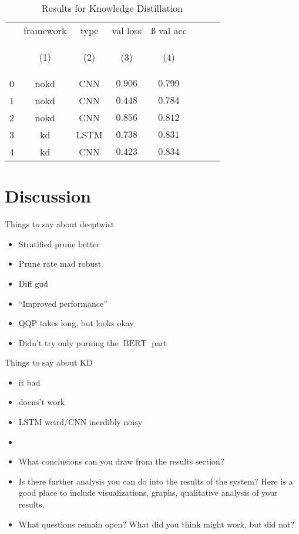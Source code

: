\documentclass[10pt]{article}
\newcommand{\bert}{\operatorname{BERT}}
\begin{document}
\begin{table}[tbh]
        \caption{Results for Knowledge Distillation}
        \label{tab:kd_results}
        \centering
        \vspace{1em}
        \begin{tabular}{lccccccc}
\toprule
{} &  framework &  type &  val loss &  ß val acc \\
{} & \hypertarget{tabcol:1}{(1)} & \hypertarget{tabcol:2}{(2)} & \hypertarget{tabcol:3}{(3)} & \hypertarget{tabcol:4}{(4)} \\
\midrule
0 &        nokd &   CNN &   $0.906$ &   $0.799$ \\
1 &        nokd &   CNN &   $0.448$ &   $0.784$ \\
2 &        nokd &   CNN &   $0.856$ &   $0.812$ \\
3 &          kd &  LSTM &   $0.738$ &   $0.831$ \\
4 &          kd &   CNN &   $0.423$ &   $0.834$ \\
\bottomrule
\end{tabular}

\end{table}

\section{Discussion}
Things to say about deeptwist
\begin{itemize}
  \item Stratified prune better
  \item Prune rate mad robust
  \item Diff gud
  \item ``Improved performance''
  \item QQP takes long, but looks okay
  \item Didn't try only purning the $\bert$ part
\end{itemize}

Things to say about KD
\begin{itemize}
  \item it bad
  \item doens't work
  \item LSTM weird/CNN incrdibly noisy
  \item {}
\end{itemize}

\begin{itemize}
\item What conclusions can you draw from the results section?
\item Is there further analysis you can do into the results of the system? Here
is a good place to include visualizations, graphs, qualitative analysis of your
results.

\item  What questions remain open? What did you think might work, but did not?
\end{itemize}
\end{document}
